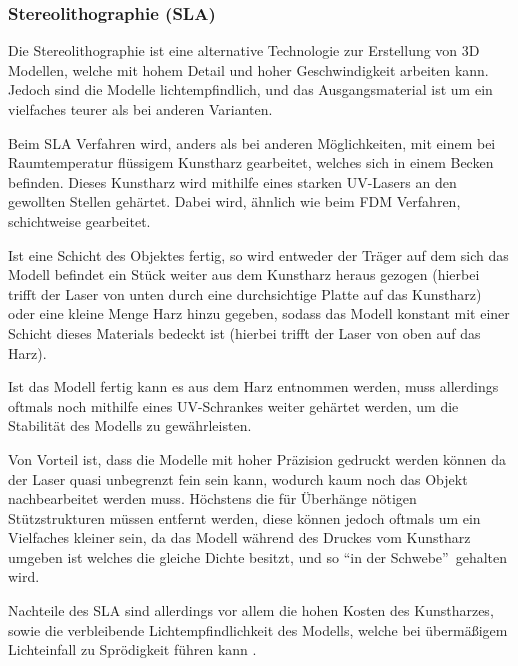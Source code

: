 \subsubsection{Stereolithographie (SLA)}

Die Stereolithographie ist eine alternative Technologie zur Erstellung von 3D Modellen, welche mit hohem Detail und hoher Geschwindigkeit arbeiten kann. Jedoch sind die Modelle lichtempfindlich, und das Ausgangsmaterial ist um ein vielfaches teurer als bei anderen Varianten.

Beim SLA Verfahren wird, anders als bei anderen Möglichkeiten, mit einem bei Raumtemperatur flüssigem Kunstharz gearbeitet, welches sich in einem Becken befinden.
Dieses Kunstharz wird mithilfe eines starken UV-Lasers an den gewollten Stellen gehärtet. Dabei wird, ähnlich wie beim FDM Verfahren, schichtweise gearbeitet.

Ist eine Schicht des Objektes fertig, so wird entweder der Träger auf dem sich das Modell befindet ein Stück weiter aus dem Kunstharz heraus gezogen (hierbei trifft der Laser von unten durch eine durchsichtige Platte auf das Kunstharz) oder eine kleine Menge Harz hinzu gegeben, sodass das Modell konstant mit einer Schicht dieses Materials bedeckt ist (hierbei trifft der Laser von oben auf das Harz).

Ist das Modell fertig kann es aus dem Harz entnommen werden, muss allerdings oftmals noch mithilfe eines UV-Schrankes weiter gehärtet werden, um die Stabilität des Modells zu gewährleisten.

Von Vorteil ist, dass die Modelle mit hoher Präzision gedruckt werden können da der Laser quasi unbegrenzt fein sein kann, wodurch kaum noch das Objekt nachbearbeitet werden muss. Höchstens die für Überhänge nötigen Stützstrukturen müssen entfernt werden, diese können jedoch oftmals um ein Vielfaches kleiner sein, da das Modell während des Druckes vom Kunstharz umgeben ist welches die gleiche Dichte besitzt, und so \textquotedblleft in der Schwebe\textquotedblright ~gehalten wird.

Nachteile des SLA sind allerdings vor allem die hohen Kosten des Kunstharzes, sowie die verbleibende Lichtempfindlichkeit des Modells, welche bei übermäßigem Lichteinfall zu Sprödigkeit führen kann  \parencite[Informationen aus:][]{DRUCKVERFAHREN}.